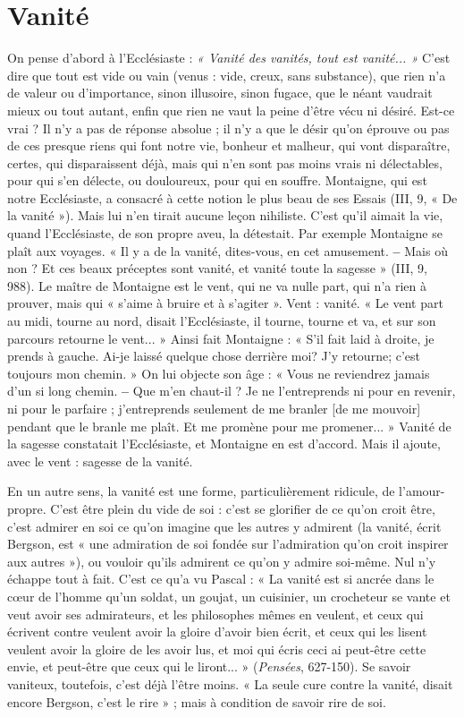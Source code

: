 \section{Vanité}
On pense d’abord à l’Ecclésiaste : {\it « Vanité des vanités, tout est
vanité... »} C’est dire que tout est vide ou vain (venus : vide, creux,
sans substance), que rien n’a de valeur ou d’importance, sinon illusoire, sinon
fugace, que le néant vaudrait mieux ou tout autant, enfin que rien ne vaut la
peine d’être vécu ni désiré. Est-ce vrai ? Il n’y a pas de réponse absolue ; il n’y
a que le désir qu’on éprouve ou pas de ces presque riens qui font notre vie, bonheur
et malheur, qui vont disparaître, certes, qui disparaissent déjà, mais qui
n’en sont pas moins vrais ni délectables, pour qui s’en délecte, ou douloureux,
pour qui en souffre. Montaigne, qui est notre Ecclésiaste, a consacré à cette
notion le plus beau de ses Essais (III, 9, « De la vanité »). Mais lui n’en tirait
aucune leçon nihiliste. C’est qu’il aimait la vie, quand l’Ecclésiaste, de son
propre aveu, la détestait. Par exemple Montaigne se plaît aux voyages. « Il y a
de la vanité, dites-vous, en cet amusement. {\bf --} Mais où non ? Et ces beaux préceptes
sont vanité, et vanité toute la sagesse » (III, 9, 988). Le maître de Montaigne
est le vent, qui ne va nulle part, qui n’a rien à prouver, mais qui « s’aime
à bruire et à s’agiter ». Vent : vanité. « Le vent part au midi, tourne au nord,
disait l’Ecclésiaste, il tourne, tourne et va, et sur son parcours retourne le
vent... » Ainsi fait Montaigne : « S'il fait laid à droite, je prends à gauche. Ai-je
laissé quelque chose derrière moi? J'y retourne; c’est toujours mon
chemin. » On lui objecte son âge : « Vous ne reviendrez jamais d’un si long
chemin. {\bf --} Que m'en chaut-il ? Je ne l’entreprends ni pour en revenir, ni pour
le parfaire ; j’entreprends seulement de me branler [de me mouvoir] pendant
que le branle me plaît. Et me promène pour me promener... » Vanité de la
sagesse constatait l’Ecclésiaste, et Montaigne en est d’accord. Mais il ajoute,
avec le vent : sagesse de la vanité.

En un autre sens, la vanité est une forme, particulièrement ridicule, de
l'amour-propre. C’est être plein du vide de soi : c’est se glorifier de ce qu’on
croit être, c’est admirer en soi ce qu’on imagine que les autres y admirent (la
vanité, écrit Bergson, est « une admiration de soi fondée sur l’admiration qu’on
croit inspirer aux autres »), ou vouloir qu’ils admirent ce qu’on y admire soi-même.
Nul n’y échappe tout à fait. C’est ce qu’a vu Pascal : « La vanité est si
ancrée dans le cœur de l’homme qu’un soldat, un goujat, un cuisinier, un crocheteur
se vante et veut avoir ses admirateurs, et les philosophes mêmes en veulent,
et ceux qui écrivent contre veulent avoir la gloire d’avoir bien écrit, et ceux
qui les lisent veulent avoir la gloire de les avoir lus, et moi qui écris ceci ai peut-être
cette envie, et peut-être que ceux qui le liront... » ({\it Pensées}, 627-150). Se
savoir vaniteux, toutefois, c’est déjà l’être moins. « La seule cure contre la
vanité, disait encore Bergson, c’est le rire » ; mais à condition de savoir rire de
soi.

